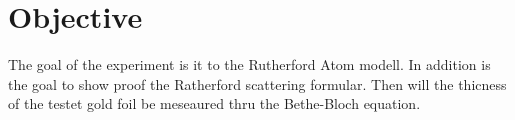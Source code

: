 \section{Objective}
\label{sec:zielsetzung}
The goal of the experiment is it to the Rutherford Atom modell. 
In addition is the goal to show proof the Ratherford scattering formular.
Then will the thicness of the testet gold foil be meseaured thru the Bethe-Bloch equation. 

